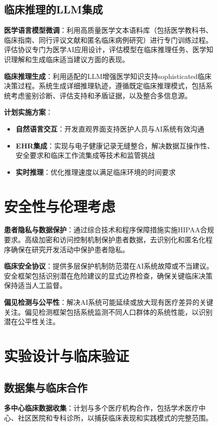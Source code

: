 \begin{figure}[htbp]
\subsection{临床推理的LLM集成}

\textbf{医学语言模型微调}：利用高质量医学文本语料库（包括医学教科书、临床指南、同行评议文献和匿名临床病例研究）进行专门训练过程。评估协议专门为医学AI应用设计，评估模型在临床推理任务、医学知识理解和生成临床适当建议方面的表现。

\textbf{临床推理生成}：利用适配的LLM增强医学知识支持sophisticated临床决策过程。系统生成详细推理轨迹，遵循既定临床推理模式，包括系统考虑鉴别诊断、评估支持和矛盾证据，以及整合多信息源。

\textbf{计划实施方案}：
\begin{itemize}
\item \textbf{自然语言交互}：开发直观界面支持医护人员与AI系统有效沟通
\item \textbf{EHR集成}：实现与电子健康记录无缝整合，解决数据互操作性、安全要求和临床工作流集成等技术和监管挑战
\item \textbf{实时推理}：优化推理速度以满足临床环境的时间要求
\end{itemize}

\section{安全性与伦理考虑}

\textbf{患者隐私与数据保护}：通过综合技术和程序保障措施实施HIPAA合规要求。高级加密和访问控制机制保护患者数据，去识别化和匿名化程序确保在研究开发活动中保护患者隐私。

\textbf{临床安全协议}：提供多层保护机制防范潜在AI系统故障或不当建议。安全框架包括识别潜在危险建议的显式边界检查，确保关键临床决策保持适当人工监督。

\textbf{偏见检测与公平性}：解决AI系统可能延续或放大现有医疗差异的关键关注。偏见检测框架包括系统监测不同人口群体的系统性能，以识别潜在公平性关注。

\section{实验设计与临床验证}

\subsection{数据集与临床合作}

\textbf{多中心临床数据收集}：计划与多个医疗机构合作，包括学术医疗中心、社区医院和专科诊所，以捕获临床表现和实践模式的完整范围。


\end{figure}
